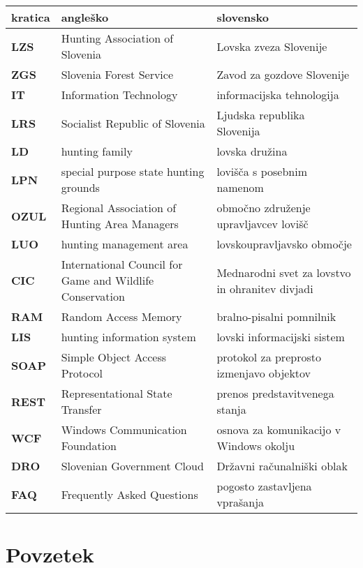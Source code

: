 \documentclass[a4paper,12pt,openright]{book}
\newcommand{\clearemptydoublepage}{\newpage{\pagestyle{empty}\cleardoublepage}}
\begin{document}
\noindent\begin{tabular}{p{}|p{}|p{}}    %
  {\bf kratica} & {\bf angleško}                              & {\bf slovensko} \\ \hline
  {\bf LZS}   & Hunting Association of Slovenia & Lovska zveza Slovenije \\
  {\bf ZGS}   & Slovenia Forest Service & Zavod za gozdove Slovenije \\
  {\bf IT}    & Information Technology & informacijska tehnologija \\
  {\bf LRS}   & Socialist Republic of Slovenia & Ljudska republika Slovenija \\
  {\bf LD}    & hunting family & lovska družina \\
  {\bf LPN}   & special purpose state hunting grounds & lovišča s posebnim namenom \\
  {\bf OZUL}  & Regional Association of Hunting Area Managers & območno združenje upravljavcev lovišč \\
  {\bf LUO}   & hunting management area & lovskoupravljavsko območje \\
  {\bf CIC}   & International Council for Game and Wildlife Conservation & Mednarodni svet za lovstvo in ohranitev divjadi \\
  {\bf RAM}   & Random Access Memory & bralno-pisalni pomnilnik \\
  {\bf LIS}   & hunting information system & lovski informacijski sistem \\
  {\bf SOAP}  & Simple Object Access Protocol & protokol za preprosto izmenjavo objektov \\
  {\bf REST}  & Representational State Transfer & prenos predstavitvenega stanja \\
  {\bf WCF}   & Windows Communication Foundation & osnova za komunikacijo v Windows okolju \\
  {\bf DRO}   & Slovenian Government Cloud & Državni računalniški oblak \\
  {\bf FAQ}   & Frequently Asked Questions  & pogosto zastavljena vprašanja \\
\end{tabular}



\clearemptydoublepage

\chapter*{Povzetek}
\end{document}
